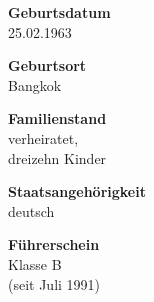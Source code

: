 \documentclass{article}
\begin{document}
\begin{minipage}[t]{0.4\textwidth}
\begin{flushright}	
\textbf{Geburtsdatum}\\
	25.02.1963\\\vspace{2 cm}
	
	\textbf{Geburtsort}\\
	Bangkok
	\\\vspace{2 cm}
		
	\textbf{Familienstand}\\
	verheiratet,\\
	dreizehn Kinder\\\vspace{2 cm}
		
	\textbf{Staatsangehörigkeit}\\
	deutsch\\\vspace{2 cm}

	
	\textbf{Führerschein}\\
	Klasse B\\
	(seit Juli 1991)\\
\end{flushright}
\end{minipage}
\end{document}
